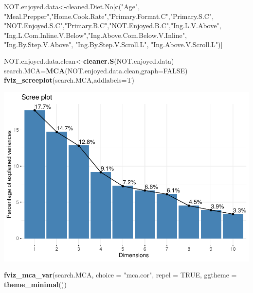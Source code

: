 \documentclass[
]{article}
\newenvironment{Shaded}{\begin{snugshade}}{\end{snugshade}}
\newcommand{\DataTypeTok}[1]{\textcolor[rgb]{0.13,0.29,0.53}{#1}}
\newcommand{\KeywordTok}[1]{\textcolor[rgb]{0.13,0.29,0.53}{\textbf{#1}}}
\newcommand{\NormalTok}[1]{#1}
\newcommand{\OtherTok}[1]{\textcolor[rgb]{0.56,0.35,0.01}{#1}}
\newcommand{\StringTok}[1]{\textcolor[rgb]{0.31,0.60,0.02}{#1}}
\begin{document}
\begin{Shaded}
\begin{Highlighting}[]
\NormalTok{NOT.enjoyed.data<-cleaned.Diet.No[}\KeywordTok{c}\NormalTok{(}\StringTok{"Age"}\NormalTok{, }\StringTok{"Meal.Prepper"}\NormalTok{,}\StringTok{"Home.Cook.Rate"}\NormalTok{,}\StringTok{"Primary.Format.C"}\NormalTok{,}\StringTok{"Primary.S.C"}\NormalTok{,}
            \StringTok{"NOT.Enjoyed.S.C"}\NormalTok{,}\StringTok{"Primary.B.C"}\NormalTok{,}\StringTok{"NOT.Enjoyed.B.C"}\NormalTok{,}\StringTok{"Ing.L.V.Above"}\NormalTok{,}
            \StringTok{"Ing.L.Com.Inline.V.Below"}\NormalTok{,}\StringTok{"Ing.Above.Com.Below.V.Inline"}\NormalTok{,  }\StringTok{"Ing.By.Step.V.Above"}\NormalTok{,  }\StringTok{"Ing.By.Step.V.Scroll.L"}\NormalTok{,}
            \StringTok{"Ing.Above.V.Scroll.L"}\NormalTok{)]}

\NormalTok{NOT.enjoyed.data.clean<-}\KeywordTok{cleaner.S}\NormalTok{(NOT.enjoyed.data)}
\NormalTok{search.MCA=}\KeywordTok{MCA}\NormalTok{(NOT.enjoyed.data.clean,}\DataTypeTok{graph=}\OtherTok{FALSE}\NormalTok{)}
\KeywordTok{fviz_screeplot}\NormalTok{(search.MCA,}\DataTypeTok{addlabels=}\NormalTok{T)}
\end{Highlighting}
\end{Shaded}

\includegraphics{Average-User-MCA_files/figure-latex/diet no not enjoyed-1.pdf}

\begin{Shaded}
\begin{Highlighting}[]
\KeywordTok{fviz_mca_var}\NormalTok{(search.MCA, }\DataTypeTok{choice =} \StringTok{"mca.cor"}\NormalTok{, }\DataTypeTok{repel =} \OtherTok{TRUE}\NormalTok{,}
             \DataTypeTok{ggtheme =} \KeywordTok{theme_minimal}\NormalTok{())}
\end{Highlighting}
\end{Shaded}
\end{document}

